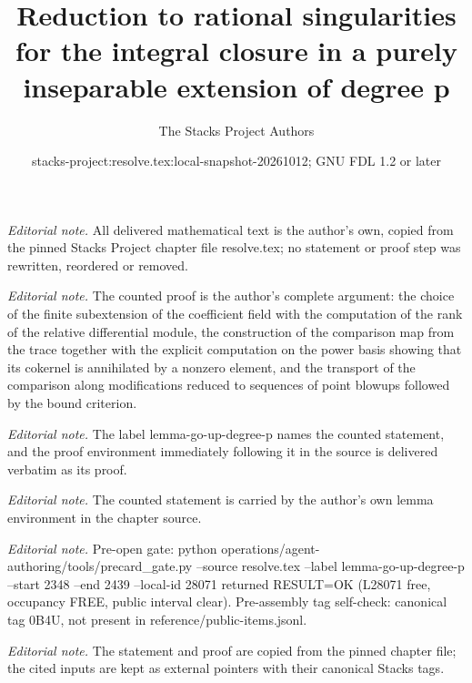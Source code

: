 \documentclass[10pt,a4paper]{amsart}
\title{Reduction to rational singularities for the integral closure in a purely inseparable extension of degree p}
\author{The Stacks Project Authors}
\date{stacks-project:resolve.tex:local-snapshot-20261012; GNU FDL 1.2 or later}
\theoremstyle{plain}
\theoremstyle{definition}
\theoremstyle{remark}
\numberwithin{equation}{subsection}
\begin{document}
\maketitle
\noindent\textit{Editorial note.} All delivered mathematical text is the author's own, copied from the pinned Stacks Project chapter file resolve.tex; no statement or proof step was rewritten, reordered or removed.\par\medskip
\noindent\textit{Editorial note.} The counted proof is the author's complete argument: the choice of the finite subextension of the coefficient field with the computation of the rank of the relative differential module, the construction of the comparison map from the trace together with the explicit computation on the power basis showing that its cokernel is annihilated by a nonzero element, and the transport of the comparison along modifications reduced to sequences of point blowups followed by the bound criterion.\par\medskip
\noindent\textit{Editorial note.} The label lemma-go-up-degree-p names the counted statement, and the proof environment immediately following it in the source is delivered verbatim as its proof.\par\medskip
\noindent\textit{Editorial note.} The counted statement is carried by the author's own lemma environment in the chapter source.\par\medskip
\noindent\textit{Editorial note.} Pre-open gate: python operations/agent-authoring/tools/precard\_gate.py --source resolve.tex --label lemma-go-up-degree-p --start 2348 --end 2439 --local-id 28071 returned RESULT=OK (L28071 free, occupancy FREE, public interval clear). Pre-assembly tag self-check: canonical tag 0B4U, not present in reference/public-items.jsonl.\par\medskip
\noindent\textit{Editorial note.} The statement and proof are copied from the pinned chapter file; the cited inputs are kept as external pointers with their canonical Stacks tags.\par\medskip
\end{document}
